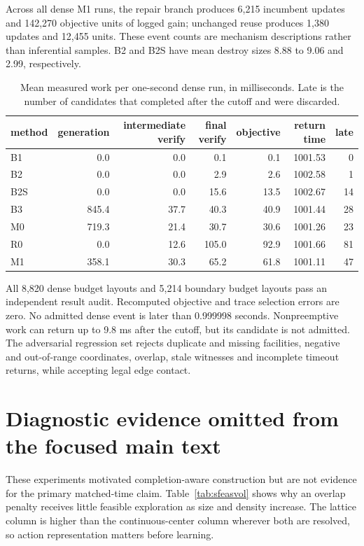 \documentclass[11pt]{article}
\begin{document}
Across all dense M1 runs, the repair branch produces 6,215 incumbent updates
and 142,270 objective units of logged gain; unchanged reuse produces 1,380
updates and 12,455 units. These event counts are mechanism descriptions rather
than inferential samples. B2 and B2S have mean destroy sizes 8.88 to 9.06 and
2.99, respectively.

\begin{table}[htbp]
\centering
\caption{Mean measured work per one-second dense run, in milliseconds. Late is
the number of candidates that completed after the cutoff and were discarded.}
\label{tab:sharedtiming}
\small
\begin{tabular}{@{}lrrrrrr@{}}
\toprule
method & generation & intermediate verify & final verify & objective & return time & late \\
\midrule
B1  & 0.0 & 0.0 & 0.1 & 0.1 & 1001.53 & 0 \\
B2  & 0.0 & 0.0 & 2.9 & 2.6 & 1002.58 & 1 \\
B2S & 0.0 & 0.0 & 15.6 & 13.5 & 1002.67 & 14 \\
B3  & 845.4 & 37.7 & 40.3 & 40.9 & 1001.44 & 28 \\
M0  & 719.3 & 21.4 & 30.7 & 30.6 & 1001.26 & 23 \\
R0  & 0.0 & 12.6 & 105.0 & 92.9 & 1001.66 & 81 \\
M1  & 358.1 & 30.3 & 65.2 & 61.8 & 1001.11 & 47 \\
\bottomrule
\end{tabular}
\end{table}

All 8,820 dense budget layouts and 5,214 boundary budget layouts pass an
independent result audit. Recomputed objective and trace selection errors are
zero. No admitted dense event is later than 0.999998 seconds. Nonpreemptive
work can return up to 9.8 ms after the cutoff, but its candidate is not admitted.
The adversarial regression set rejects duplicate and missing
facilities, negative and out-of-range coordinates, overlap, stale witnesses and
incomplete timeout returns, while accepting legal edge contact.

\section{Diagnostic evidence omitted from the focused main text}
\label{app:legacydiagnostics}

These experiments motivated completion-aware construction but are not evidence
for the primary matched-time claim. Table~\ref{tab:sfeasvol} shows why an overlap
penalty receives little feasible exploration as size and density increase. The
lattice column is higher than the continuous-center column wherever both are
resolved, so action representation matters before learning.
\end{document}
